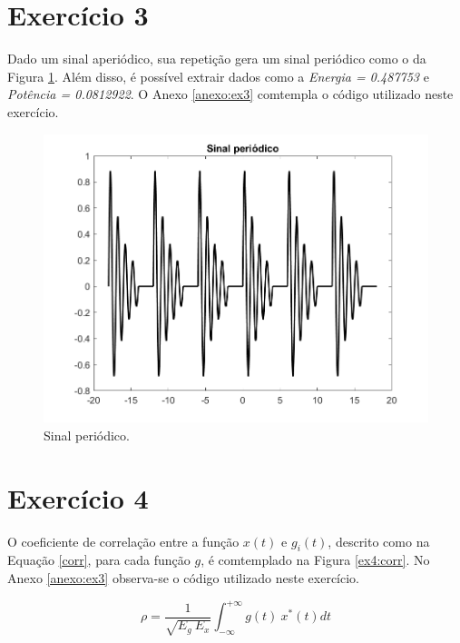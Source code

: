 \documentclass[a4paper,12pt,oneside,openany,table,xcdraw]{article}
\begin{document}
\vspace{0.3cm}
\section{Exercício 3}
Dado um sinal aperiódico, sua repetição gera um sinal periódico como o da Figura \ref{ex3:sinal}. Além disso, é possível extrair dados como a \textit{Energia = 0.487753} e \textit{Potência = 0.0812922}. O Anexo \ref{anexo:ex3} comtempla o código utilizado neste exercício.

\vspace{0.4cm}
\begin{figure}[H]
\centering
\includegraphics[width=16cm]{ex3-sinal}
\caption{Sinal periódico.}
\label{ex3:sinal}
\end{figure}

\vspace{0.3cm}
\section{Exercício 4}
O coeficiente de correlação entre a função $x(t)$ e $g_i(t)$, descrito como na Equação \ref{corr}, para cada função $g$, é comtemplado na Figura \ref{ex4:corr}. No Anexo \ref{anexo:ex3} observa-se o código utilizado neste exercício.

\vspace{0.4cm}
\begin{equation} \label{corr}
\rho = \dfrac{1}{\sqrt{E_g\ E_x}} \int^{+\infty} _{-\infty} {g(t)\ x^*(t)} dt
\end{equation}
\end{document}
